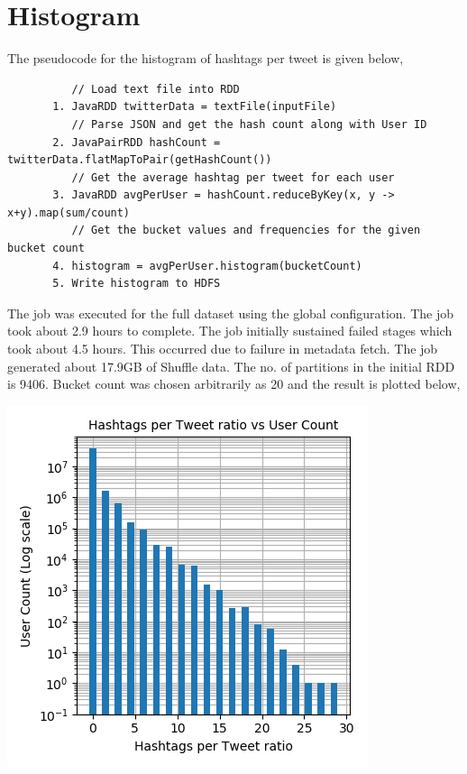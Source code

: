 \documentclass[11pt,a4paper,oneside]{article}
\begin{document}
    \section{Histogram}
    The pseudocode for the histogram of hashtags per tweet is given below,
    
    \begin{verbatim} 
          // Load text file into RDD
       1. JavaRDD twitterData = textFile(inputFile)
          // Parse JSON and get the hash count along with User ID
       2. JavaPairRDD hashCount = twitterData.flatMapToPair(getHashCount()) 
          // Get the average hashtag per tweet for each user
       3. JavaRDD avgPerUser = hashCount.reduceByKey(x, y -> x+y).map(sum/count)
          // Get the bucket values and frequencies for the given bucket count
       4. histogram = avgPerUser.histogram(bucketCount)
       5. Write histogram to HDFS     
    \end{verbatim}    
    The job was executed for the full dataset using the global configuration. The job took about 2.9 hours to complete. The job initially sustained failed stages which took about 4.5 hours. This occurred due to failure in metadata fetch. The job generated about 17.9GB of Shuffle data. The no. of partitions in the initial RDD is 9406. Bucket count was chosen arbitrarily as 20 and the result is plotted below,
    
    \begin{center}
    	\includegraphics[scale=0.6]{1.png}		
    \end{center}
\end{document}
